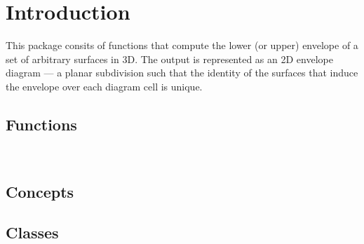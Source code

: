 \section*{Introduction}
\label{env3_ref_sec:intro}

This package consits of functions that compute the lower (or upper)
envelope of a set of arbitrary surfaces in 3D. The output is
represented as an 2D envelope diagram --- a planar subdivision such
that the identity of the surfaces that induce the envelope over each
diagram cell is unique.

\subsection*{Functions}

\\

\subsection*{Concepts}


\subsection*{Classes}

\\
\\
\\
\\


